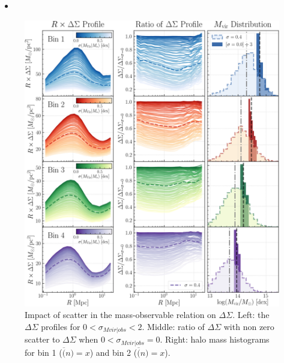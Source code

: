 \documentclass[a4paper,fleqn,usenatbib]{mnras}
\begin{document}

    \begin{itemize}
        
        \item 

    \end{itemize}

  \begin{figure}
      \centering 
      \includegraphics[width=\textwidth]{figure/topn_mdpl2_dsigma}
      \caption{Impact of scatter in the mass-observable relation on $\Delta\Sigma$. Left: the
        $\Delta\Sigma$ profiles for $0<\sigma_{Mvir|obs}<2$. Middle: ratio of $\Delta\Sigma$ with
        non zero scatter to $\Delta\Sigma$ when $0<\sigma_{Mvir|obs}=0$. Right: halo mass
        histograms for bin 1 ($\overline(n)=x$) and bin 2 ($\overline(n)=x$).} \label{fig:mdpl2}
  \end{figure}
\end{document}
